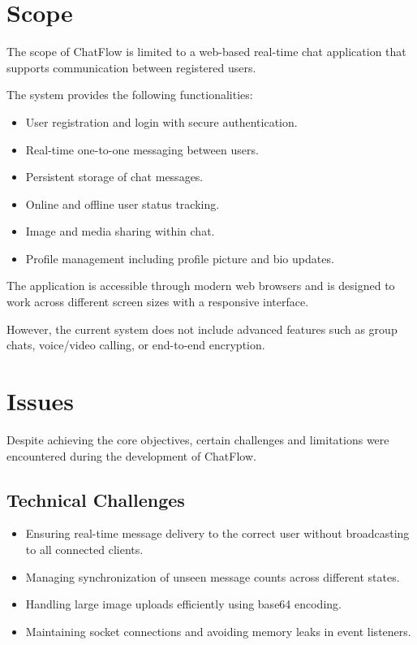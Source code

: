 \documentclass[12pt,a4paper]{report}
\begin{document}
\section{Scope}

The scope of ChatFlow is limited to a web-based real-time chat application that supports communication between registered users.

The system provides the following functionalities:

\begin{itemize}
    \item User registration and login with secure authentication.
    \item Real-time one-to-one messaging between users.
    \item Persistent storage of chat messages.
    \item Online and offline user status tracking.
    \item Image and media sharing within chat.
    \item Profile management including profile picture and bio updates.
\end{itemize}

The application is accessible through modern web browsers and is designed to work across different screen sizes with a responsive interface.

However, the current system does not include advanced features such as group chats, voice/video calling, or end-to-end encryption.

\section{Issues}

Despite achieving the core objectives, certain challenges and limitations were encountered during the development of ChatFlow.

\subsection{Technical Challenges}

\begin{itemize}
    \item Ensuring real-time message delivery to the correct user without broadcasting to all connected clients.
    \item Managing synchronization of unseen message counts across different states.
    \item Handling large image uploads efficiently using base64 encoding.
    \item Maintaining socket connections and avoiding memory leaks in event listeners.
\end{itemize}
\end{document}
